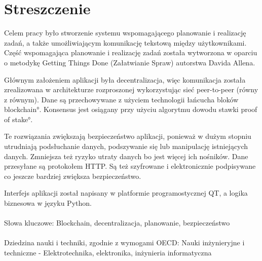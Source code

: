 \chapter*{Streszczenie}
\thispagestyle{plain}

Celem pracy było stworzenie systemu wspomagającego planowanie i realizację zadań, a także umożliwiającym komunikację tekstową między użytkownikami. Część wspomagająca planowanie i realizację zadań została wytworzona w oparciu o metodykę Getting Things Done (Załatwianie Spraw) autorstwa Davida Allena. 

Głównym założeniem aplikacji była decentralizacja, więc komunikacja została zrealizowana w architekturze rozproszonej wykorzystując sieć peer-to-peer (równy z równym). Dane są przechowywane z użyciem technologii łańcucha bloków \ang{blockchain}. Konsensus jest osiągany przy użyciu algorytmu dowodu stawki \ang{proof of stake}.

Te rozwiązania zwiększają bezpieczeństwo aplikacji, ponieważ w dużym stopniu utrudniają podsłuchanie danych, podszywanie się lub manipulację istniejących danych. Zmniejsza też ryzyko utraty danych bo jest więcej ich nośników. Dane przesyłane są protokołem HTTP. Są też szyfrowane i elektronicznie podpisywane co jeszcze bardziej zwiększa bezpieczeństwo. 

Interfejs aplikacji został napisany w platformie programostycznej QT, a logika biznesowa w języku Python.
\\\\
Słowa kluczowe: Blockchain, decentralizacja, planowanie, bezpieczeństwo
\\\\
Dziedzina nauki i techniki, zgodnie z wymogami OECD: Nauki inżynieryjne i techniczne - Elektrotechnika, elektronika, inżynieria informatyczna
